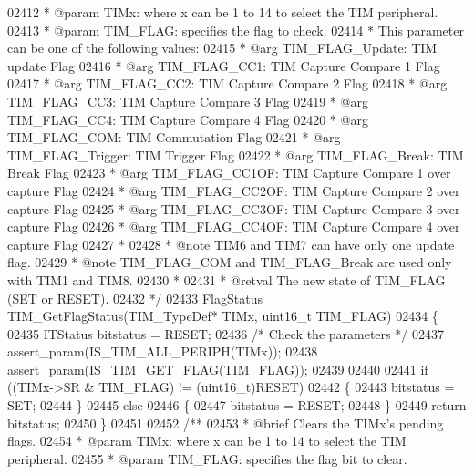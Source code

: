 \begin{DoxyCode}
02412 \textcolor{comment}{  * @param  TIMx: where x can be 1 to 14 to select the TIM peripheral.}
02413 \textcolor{comment}{  * @param  TIM\_FLAG: specifies the flag to check.}
02414 \textcolor{comment}{  *          This parameter can be one of the following values:}
02415 \textcolor{comment}{  *            @arg TIM\_FLAG\_Update: TIM update Flag}
02416 \textcolor{comment}{  *            @arg TIM\_FLAG\_CC1: TIM Capture Compare 1 Flag}
02417 \textcolor{comment}{  *            @arg TIM\_FLAG\_CC2: TIM Capture Compare 2 Flag}
02418 \textcolor{comment}{  *            @arg TIM\_FLAG\_CC3: TIM Capture Compare 3 Flag}
02419 \textcolor{comment}{  *            @arg TIM\_FLAG\_CC4: TIM Capture Compare 4 Flag}
02420 \textcolor{comment}{  *            @arg TIM\_FLAG\_COM: TIM Commutation Flag}
02421 \textcolor{comment}{  *            @arg TIM\_FLAG\_Trigger: TIM Trigger Flag}
02422 \textcolor{comment}{  *            @arg TIM\_FLAG\_Break: TIM Break Flag}
02423 \textcolor{comment}{  *            @arg TIM\_FLAG\_CC1OF: TIM Capture Compare 1 over capture Flag}
02424 \textcolor{comment}{  *            @arg TIM\_FLAG\_CC2OF: TIM Capture Compare 2 over capture Flag}
02425 \textcolor{comment}{  *            @arg TIM\_FLAG\_CC3OF: TIM Capture Compare 3 over capture Flag}
02426 \textcolor{comment}{  *            @arg TIM\_FLAG\_CC4OF: TIM Capture Compare 4 over capture Flag}
02427 \textcolor{comment}{  *}
02428 \textcolor{comment}{  * @note   TIM6 and TIM7 can have only one update flag. }
02429 \textcolor{comment}{  * @note   TIM\_FLAG\_COM and TIM\_FLAG\_Break are used only with TIM1 and TIM8.    }
02430 \textcolor{comment}{  *}
02431 \textcolor{comment}{  * @retval The new state of TIM\_FLAG (SET or RESET).}
02432 \textcolor{comment}{  */}
02433 FlagStatus TIM_GetFlagStatus(TIM\_TypeDef* TIMx, uint16\_t TIM\_FLAG)
02434 \{
02435   ITStatus bitstatus = RESET;
02436   \textcolor{comment}{/* Check the parameters */}
02437   assert_param(IS\_TIM\_ALL\_PERIPH(TIMx));
02438   assert_param(IS\_TIM\_GET\_FLAG(TIM\_FLAG));
02439 
02440 
02441   \textcolor{keywordflow}{if} ((TIMx->SR & TIM\_FLAG) != (uint16\_t)RESET)
02442   \{
02443     bitstatus = SET;
02444   \}
02445   \textcolor{keywordflow}{else}
02446   \{
02447     bitstatus = RESET;
02448   \}
02449   \textcolor{keywordflow}{return} bitstatus;
02450 \}
02451 
02452 \textcolor{comment}{/**}
02453 \textcolor{comment}{  * @brief  Clears the TIMx's pending flags.}
02454 \textcolor{comment}{  * @param  TIMx: where x can be 1 to 14 to select the TIM peripheral.}
02455 \textcolor{comment}{  * @param  TIM\_FLAG: specifies the flag bit to clear.}

\end{DoxyCode}
